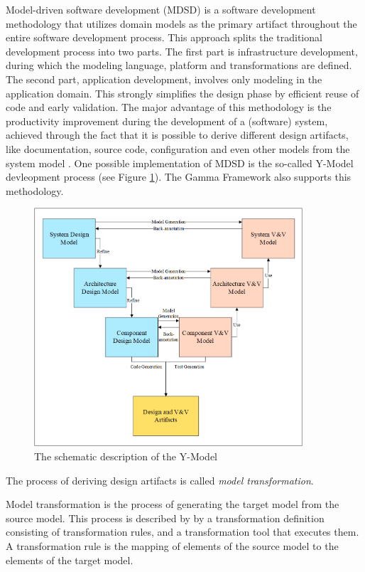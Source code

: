 Model-driven software development (MDSD) is a software development methodology that utilizes domain models as the primary artifact throughout the entire software development process. This approach splits the traditional development process into two parts. The first part is infrastructure development, during which the modeling language, platform and transformations are defined. The second part, application development, involves only modeling in the application domain. This strongly simplifies the design phase by efficient reuse of code and early validation. The major advantage of this methodology is the productivity improvement during the development of a (software) system, achieved through the fact that it is possible to derive different design artifacts, like documentation, source code, configuration and even other models from the system model \cite{RoadToModelTransf}. One possible implementation of MDSD is the so-called Y-Model devleopment process (see Figure \ref{fig:yModel}). The Gamma Framework also supports this methodology.
\begin{figure}[!ht]
	\centering
	\includegraphics[width=100mm, keepaspectratio]{figures/yModel.png}
	\caption{The schematic description of the Y-Model}
	\label{fig:yModel}
\end{figure}

The process of deriving design artifacts is called \textit{model transformation}.
\begin{definition}
	Model transformation is the process of generating the target model from the source model. This process is described by by a transformation definition consisting of transformation rules, and a transformation tool that executes them. A transformation rule is the mapping of elements of the source model to the elements of the target model. \cite{ModelTransformation}
\end{definition}

